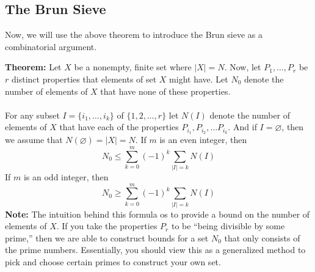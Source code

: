 \subsection{The Brun Sieve}
Now, we will use the above theorem to introduce the Brun sieve as a combinatorial argument.
\begin{boxedsection}
\textbf{Theorem:} Let $X$ be a nonempty, finite set where $|X| = N$. Now, let $P_1, \dots, P_r$ be $r$ distinct properties that elements of set $X$ might have. Let $N_0$ denote the number of elements of $X$ that have none of these properties. \\
\\
For any subset $I = \{i_1, \dots, i_k\}$ of $\{1,2,\dots, r\}$ let $N(I)$ denote the number of elements of $X$ that have each of the properties $P_{i_1}, P_{i_2}, \dots P_{i_k}$. And if $I = \varnothing$, then we assume that $N(\varnothing) = |X| = N$. If $m$ is an even integer, then
$$
N_0 \leq \sum_{k=0}^m (-1)^k \sum_{|I| = k} N(I)
$$
If $m$ is an odd integer, then 
$$
N_0 \geq \sum_{k=0}^m (-1)^k \sum_{|I| = k} N(I)
$$
\textbf{Note:} The intuition behind this formula os to provide a bound on the number of elements of $X$. If you take the properties $P_r$ to be ``being divisible by some prime,'' then we are able to construct bounds for a set $N_0$ that only consists of the prime numbers. Essentially, you should view this as a generalized method to pick and choose certain primes to construct your own set.
\end{boxedsection}
\pagebreak
